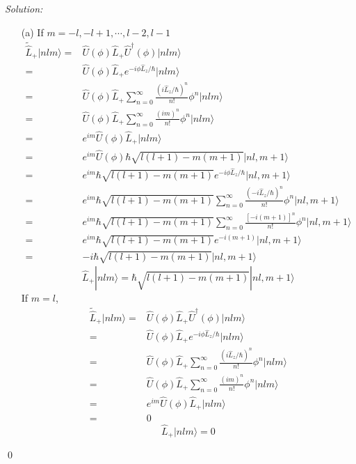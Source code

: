 \documentclass[10pt,a4paper]{article}
\newenvironment{sol}
    {\emph{Solution:}
    }
    {
    \qed
    }
\begin{document}
\begin{sol}
\begin{itemize}
\item[(a)] If $m=-l,-l+1,\cdots,l-2,l-1$
\begin{align}
\nonumber\tilde{\hat{L}}_+|nlm\rangle=&\hat{U}(\phi)\hat{L}_+\hat{U}^{\dagger}(\phi)|nlm\rangle\\
\nonumber=&\hat{U}(\phi)\hat{L}_+e^{-i\phi\hat{L}_z/\hbar}|nlm\rangle\\
\nonumber=&\hat{U}(\phi)\hat{L}_+\sum_{n=0}^{\infty}\frac{(i\hat{L}_z/\hbar)^n}{n!}\phi^n|nlm\rangle\\
\nonumber=&\hat{U}(\phi)\hat{L}_+\sum_{n=0}^{\infty}\frac{(im)^n}{n!}\phi^n|nlm\rangle\\
\nonumber=&e^{im}\hat{U}(\phi)\hat{L}_+|nlm\rangle\\
\nonumber=&e^{im}\hat{U}(\phi)\hbar\sqrt{l(l+1)-m(m+1)}|nl,m+1\rangle\\
\nonumber=&e^{im}\hbar\sqrt{l(l+1)-m(m+1)}e^{-i\phi\hat{L}_z/\hbar}|nl,m+1\rangle\\
\nonumber=&e^{im}\hbar\sqrt{l(l+1)-m(m+1)}\sum_{n=0}^{\infty}\frac{(-i\hat{L}_z/\hbar)^n}{n!}\phi^n|nl,m+1\rangle\\
\nonumber=&e^{im}\hbar\sqrt{l(l+1)-m(m+1)}\sum_{n=0}^{\infty}\frac{[-i(m+1)]^n}{n!}\phi^n|nl,m+1\rangle\\
\nonumber=&e^{im}\hbar\sqrt{l(l+1)-m(m+1)}e^{-i(m+1)}|nl,m+1\rangle\\
=&-i\hbar\sqrt{l(l+1)-m(m+1)}|nl,m+1\rangle
\end{align}
\begin{equation}
\hat{L}_+|nlm\rangle=\hbar\sqrt{l(l+1)-m(m+1)}|nl,m+1\rangle
\end{equation}
If $m=l$,
\begin{align}
\nonumber\tilde{\hat{L}}_+|nlm\rangle=&\hat{U}(\phi)\hat{L}_+\hat{U}^{\dagger}(\phi)|nlm\rangle\\
\nonumber=&\hat{U}(\phi)\hat{L}_+e^{-i\phi\hat{L}_z/\hbar}|nlm\rangle\\
\nonumber=&\hat{U}(\phi)\hat{L}_+\sum_{n=0}^{\infty}\frac{(i\hat{L}_z/\hbar)^n}{n!}\phi^n|nlm\rangle\\
\nonumber=&\hat{U}(\phi)\hat{L}_+\sum_{n=0}^{\infty}\frac{(im)^n}{n!}\phi^n|nlm\rangle\\
\nonumber=&e^{im}\hat{U}(\phi)\hat{L}_+|nlm\rangle\\
=&0
\end{align}
\begin{equation}
\hat{L}_+|nlm\rangle=0
\end{equation}

\end{itemize}
\end{sol}
\end{document}
